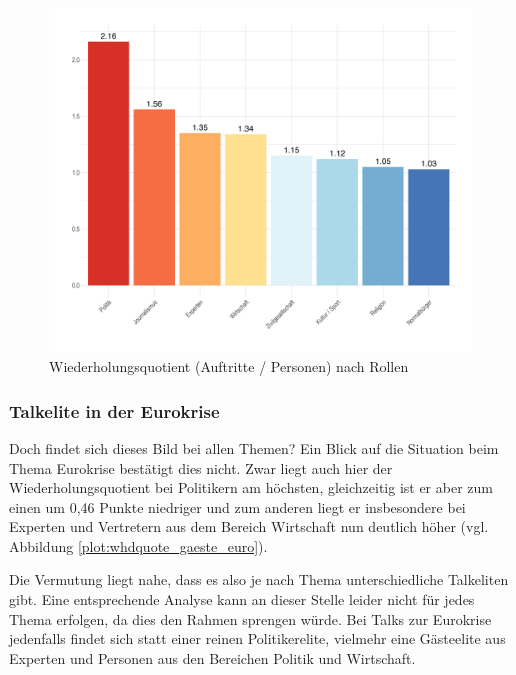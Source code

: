 \begin{figure}[ht]
	\centering
	\includegraphics[width=1\textwidth]{daten/grafiken/plot_wdhquote_gaeste_allg.png}
	\caption{Wiederholungsquotient (Auftritte / Personen) nach Rollen}
	\label{plot:whdquote_gaeste_allg}
\end{figure}

\subsubsection{Talkelite in der Eurokrise}

Doch findet sich dieses Bild bei allen Themen? Ein Blick auf die Situation beim Thema Eurokrise bestätigt dies nicht. Zwar liegt auch hier der Wiederholungsquotient bei Politikern am höchsten, gleichzeitig ist er aber zum einen um 0,46 Punkte niedriger und zum anderen liegt er insbesondere bei Experten und Vertretern aus dem Bereich Wirtschaft nun deutlich höher (vgl. Abbildung \vref{plot:whdquote_gaeste_euro}).

Die Vermutung liegt nahe, dass es also je nach Thema unterschiedliche Talkeliten gibt. Eine entsprechende Analyse kann an dieser Stelle leider nicht für jedes Thema erfolgen, da dies den Rahmen sprengen würde. Bei Talks zur Eurokrise jedenfalls findet sich statt einer reinen Politikerelite, vielmehr eine Gästeelite aus Experten und Personen aus den Bereichen Politik und Wirtschaft.

